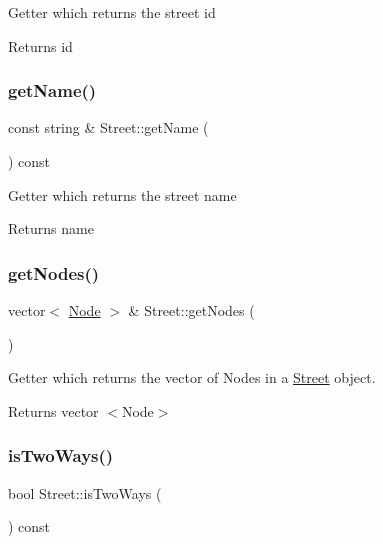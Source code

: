 Getter which returns the street id \begin{DoxyReturn}{Returns}
id 
\end{DoxyReturn}
\mbox{\label{class_street_afcd581ec643416f80695460ca8c19c73}} 
\subsubsection{\texorpdfstring{get\+Name()}{getName()}}
{\footnotesize\ttfamily const string \& Street\+::get\+Name (\begin{DoxyParamCaption}{ }\end{DoxyParamCaption}) const}

Getter which returns the street name \begin{DoxyReturn}{Returns}
name 
\end{DoxyReturn}
\mbox{\label{class_street_afedbedacf271f93b5105708e1afc6be6}} 
\subsubsection{\texorpdfstring{get\+Nodes()}{getNodes()}}
{\footnotesize\ttfamily vector$<$ \mbox{\hyperlink{class_node}{Node}} $>$ \& Street\+::get\+Nodes (\begin{DoxyParamCaption}{ }\end{DoxyParamCaption})}



Getter which returns the vector of Nodes in a \mbox{\hyperlink{class_street}{Street}} object. 

\begin{DoxyReturn}{Returns}
vector $<$\+Node$>$ 
\end{DoxyReturn}
\mbox{\label{class_street_a2948b1e4a058de686bd24af9fe5fa1e0}} 
\subsubsection{\texorpdfstring{is\+Two\+Ways()}{isTwoWays()}}
{\footnotesize\ttfamily bool Street\+::is\+Two\+Ways (\begin{DoxyParamCaption}{ }\end{DoxyParamCaption}) const}

